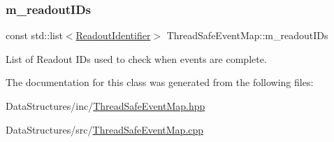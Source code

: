 \subsubsection{\texorpdfstring{m\+\_\+readout\+I\+Ds}{m\_readoutIDs}}
{\footnotesize\ttfamily const std\+::list$<$\hyperlink{class_readout_identifier}{Readout\+Identifier}$>$ Thread\+Safe\+Event\+Map\+::m\+\_\+readout\+I\+Ds\hspace{0.3cm}{\ttfamily [private]}}



List of Readout I\+Ds used to check when events are complete. 



The documentation for this class was generated from the following files\+:\begin{DoxyCompactItemize}
\item 
Data\+Structures/inc/\hyperlink{_thread_safe_event_map_8hpp}{Thread\+Safe\+Event\+Map.\+hpp}\item 
Data\+Structures/src/\hyperlink{_thread_safe_event_map_8cpp}{Thread\+Safe\+Event\+Map.\+cpp}\end{DoxyCompactItemize}
